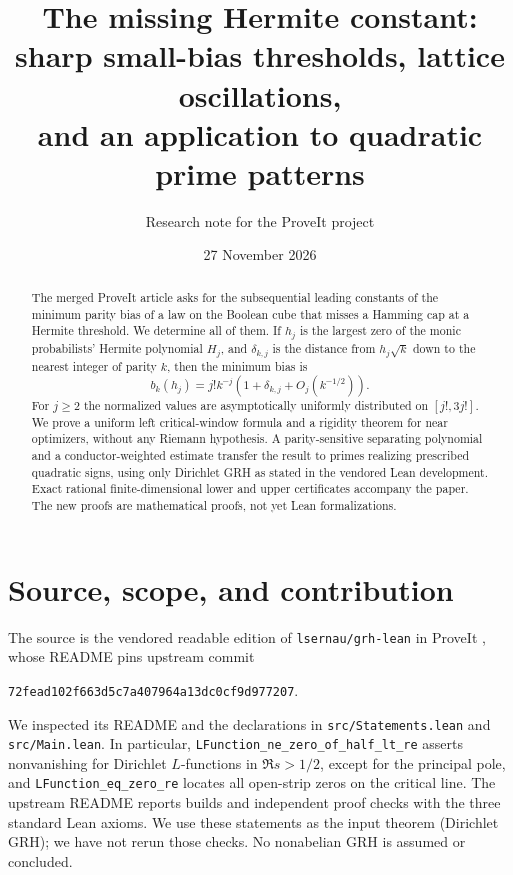 \documentclass[11pt]{article}
\title{The missing Hermite constant:\\ sharp small-bias thresholds, lattice oscillations,\\ and an application to quadratic prime patterns}
\author{Research note for the ProveIt project}
\date{27 November 2026}
\theoremstyle{remark}\newtheorem{remark}[theorem]{Remark}
\begin{document}
\maketitle
\begin{abstract}
The merged ProveIt article asks for the subsequential leading constants of the minimum parity bias of a law on the Boolean cube that misses a Hamming cap at a Hermite threshold. We determine all of them. If $h_j$ is the largest zero of the monic probabilists' Hermite polynomial $H_j$, and $\delta_{k,j}$ is the distance from $h_j\sqrt{k}$ down to the nearest integer of parity $k$, then the minimum bias is
\[
 b_k(h_j)=j!k^{-j}(1+\delta_{k,j}+O_j(k^{-1/2})).
\]
For $j\ge2$ the normalized values are asymptotically uniformly distributed on $[j!,3j!]$. We prove a uniform left critical-window formula and a rigidity theorem for near optimizers, without any Riemann hypothesis. A parity-sensitive separating polynomial and a conductor-weighted estimate transfer the result to primes realizing prescribed quadratic signs, using only Dirichlet GRH as stated in the vendored Lean development. Exact rational finite-dimensional lower and upper certificates accompany the paper. The new proofs are mathematical proofs, not yet Lean formalizations.
\end{abstract}

\section{Source, scope, and contribution}
The source is the vendored readable edition of \texttt{lsernau/grh-lean} in ProveIt \cite{vendor,upstream}, whose README pins upstream commit
\begin{center}\small\texttt{72fead102f663d5c7a407964a13dc0cf9d977207}.\end{center}
We inspected its README and the declarations in \texttt{src/Statements.lean} and \texttt{src/Main.lean}. In particular, \texttt{LFunction\_ne\_zero\_of\_half\_lt\_re} asserts nonvanishing for Dirichlet $L$-functions in $\Re s>1/2$, except for the principal pole, and \texttt{LFunction\_eq\_zero\_re} locates all open-strip zeros on the critical line. The upstream README reports builds and independent proof checks with the three standard Lean axioms. We use these statements as the input theorem (Dirichlet GRH); we have not rerun those checks. No nonabelian GRH is assumed or concluded.
\end{document}
